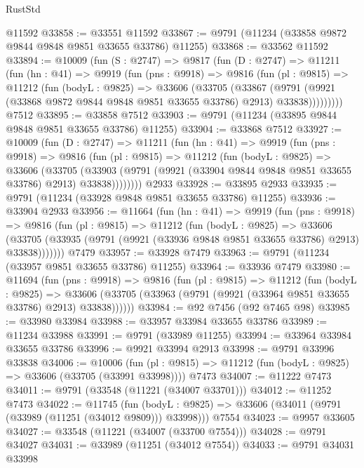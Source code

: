 \begin{lexlean}{RustStd}
\begin{coremodule}
    @11592
@33858 := @33551 @11592
@33867 := @9791 (@11234 (@33858 @9872 @9844 @9848 @9851 @33655 @33786) @11255)
@33868 := @33562 @11592
@33894 := @10009
    (fun (S : @2747) =>
    @9817
      (fun (D : @2747) =>
      @11211
        (fun (hn : @41) =>
        @9919
          (fun (pns : @9918) =>
          @9816
            (fun (pl : @9815) =>
            @11212
              (fun (bodyL : @9825) =>
              @33606
                (@33705
                  (@33867
                    (@9791
                      (@9921 (@33868 @9872 @9844 @9848 @9851 @33655 @33786) @2913)
                      @33838)))))))))
    @7512
@33895 := @33858 @7512
@33903 := @9791 (@11234 (@33895 @9844 @9848 @9851 @33655 @33786) @11255)
@33904 := @33868 @7512
@33927 := @10009
    (fun (D : @2747) =>
    @11211
      (fun (hn : @41) =>
      @9919
        (fun (pns : @9918) =>
        @9816
          (fun (pl : @9815) =>
          @11212
            (fun (bodyL : @9825) =>
            @33606
              (@33705
                (@33903 (@9791 (@9921 (@33904 @9844 @9848 @9851 @33655 @33786) @2913) @33838))))))))
    @2933
@33928 := @33895 @2933
@33935 := @9791 (@11234 (@33928 @9848 @9851 @33655 @33786) @11255)
@33936 := @33904 @2933
@33956 := @11664
    (fun (hn : @41) =>
    @9919
      (fun (pns : @9918) =>
      @9816
        (fun (pl : @9815) =>
        @11212
          (fun (bodyL : @9825) =>
          @33606
            (@33705 (@33935 (@9791 (@9921 (@33936 @9848 @9851 @33655 @33786) @2913) @33838)))))))
    @7479
@33957 := @33928 @7479
@33963 := @9791 (@11234 (@33957 @9851 @33655 @33786) @11255)
@33964 := @33936 @7479
@33980 := @11694
    (fun (pns : @9918) =>
    @9816
      (fun (pl : @9815) =>
      @11212
        (fun (bodyL : @9825) =>
        @33606 (@33705 (@33963 (@9791 (@9921 (@33964 @9851 @33655 @33786) @2913) @33838))))))
@33984 := @92 @7456 (@92 @7465 @98)
@33985 := @33980 @33984
@33988 := @33957 @33984 @33655 @33786
@33989 := @11234 @33988
@33991 := @9791 (@33989 @11255)
@33994 := @33964 @33984 @33655 @33786
@33996 := @9921 @33994 @2913
@33998 := @9791 @33996 @33838
@34006 := @10006
    (fun (pl : @9815) => @11212 (fun (bodyL : @9825) => @33606 (@33705 (@33991 @33998))))
    @7473
@34007 := @11222 @7473
@34011 := @9791 (@33548 (@11221 (@34007 @33701)))
@34012 := @11252 @7473
@34022 := @11745
    (fun (bodyL : @9825) => @33606 (@34011 (@9791 (@33989 (@11251 (@34012 @9809))) @33998)))
    @7554
@34023 := @9957 @33605
@34027 := @33548 (@11221 (@34007 (@33700 @7554)))
@34028 := @9791 @34027
@34031 := @33989 (@11251 (@34012 @7554))
@34033 := @9791 @34031 @33998

\end{coremodule}
\end{lexlean}
